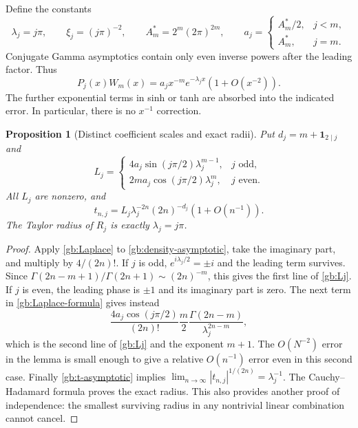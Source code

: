 \documentclass[11pt,a4paper]{article}
\numberwithin{equation}{section}
\newtheorem{proposition}[theorem]{Proposition}
\theoremstyle{definition}
\theoremstyle{remark}
\newcommand{\ind}{\mathbf 1}
\begin{document}
Define the constants
\begin{equation}\label{gb:mode-constants}
 \lambda_j=j\pi,\qquad \xi_j=(j\pi)^{-2},\qquad
 A_m^*=2^m(2\pi)^{2m},\qquad
 a_j=\begin{cases}A_m^*/2,&j<m,\\A_m^*,&j=m.
 \end{cases}
\end{equation}
Conjugate Gamma asymptotics contain only even inverse powers after
the leading factor.  Thus
\begin{equation}\label{gb:density-asymptotic}
 P_j(x)W_m(x)=a_jx^{-m}e^{-\lambda_jx}(1+O(x^{-2})).
\end{equation}
The further exponential terms in sinh or tanh are absorbed into the
indicated error.  In particular, there is no $x^{-1}$ correction.

\begin{proposition}[Distinct coefficient scales and exact radii]
\label{gb:coefficient-asymptotic}
Put $d_j=m+\ind_{2\mid j}$ and
\begin{equation}\label{gb:Lj}
 L_j=\begin{cases}
 4a_j\sin(j\pi/2)\lambda_j^{m-1},&j\text{ odd},\\
 2ma_j\cos(j\pi/2)\lambda_j^m,&j\text{ even}.
 \end{cases}
\end{equation}
All $L_j$ are nonzero, and
\begin{equation}\label{gb:t-asymptotic}
 t_{n,j}=L_j\lambda_j^{-2n}(2n)^{-d_j}(1+O(n^{-1})).
\end{equation}
The Taylor radius of $R_j$ is exactly $\lambda_j=j\pi$.
\end{proposition}

\begin{proof}
Apply \cref{gb:Laplace} to \eqref{gb:density-asymptotic}, take
the imaginary part, and multiply by $4/(2n)!$.  If $j$ is odd,
$e^{i\lambda_j/2}=\pm i$ and the leading term survives.  Since
$\Gamma(2n-m+1)/\Gamma(2n+1)\sim(2n)^{-m}$, this gives the
first line of \eqref{gb:Lj}.  If $j$ is even, the leading phase
is $\pm1$ and its imaginary part is zero.  The next term in
\eqref{gb:Laplace-formula} gives instead
\[
 \frac{4a_j\cos(j\pi/2)}{(2n)!}
 \frac{m}{2}\frac{\Gamma(2n-m)}{\lambda_j^{2n-m}},
\]
which is the second line of \eqref{gb:Lj} and the exponent $m+1$.
The $O(N^{-2})$ error in the lemma is small enough to give a
relative $O(n^{-1})$ error even in this second case.  Finally
\eqref{gb:t-asymptotic} implies
$\lim_{n\to\infty}|t_{n,j}|^{1/(2n)}=\lambda_j^{-1}$.
The Cauchy--Hadamard formula proves the exact radius.  This also
provides another proof of independence: the smallest surviving
radius in any nontrivial linear combination cannot cancel.
\end{proof}
\end{document}
